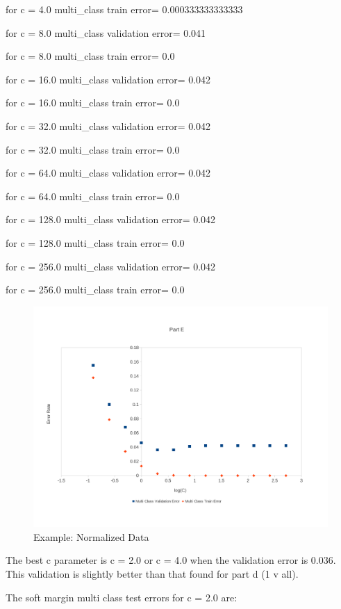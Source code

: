 \documentclass[12pt]{article}
\begin{document}
\begin{enumerate}
for c = 4.0 multi\_class train error= 0.000333333333333


for c = 8.0 multi\_class validation error= 0.041

for c = 8.0 multi\_class train error= 0.0

for c = 16.0 multi\_class validation error= 0.042

for c = 16.0 multi\_class train error= 0.0

for c = 32.0 multi\_class validation error= 0.042

for c = 32.0 multi\_class train error= 0.0

for c = 64.0 multi\_class validation error= 0.042

for c = 64.0 multi\_class train error= 0.0

for c = 128.0 multi\_class validation error= 0.042

for c = 128.0 multi\_class train error= 0.0

for c = 256.0 multi\_class validation error= 0.042

for c = 256.0 multi\_class train error= 0.0

\begin{figure}[h!]
  \caption{Example: Normalized Data}
  \centering
    \includegraphics[width=1\textwidth]{hw3_2e}
\end{figure}

The best c parameter is c = 2.0 or c = 4.0 when the validation error is 0.036. This validation is slightly better than that found for part d (1 v all).

The soft margin multi class test errors for c = 2.0 are:


\end{enumerate}
\end{document}
